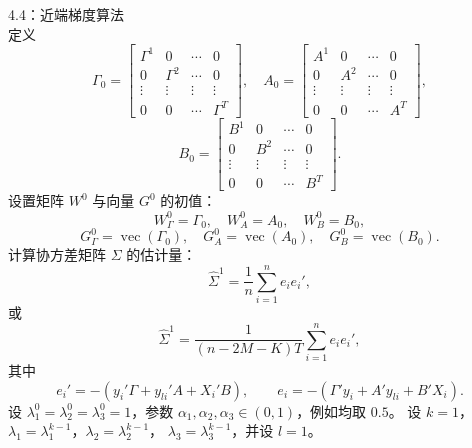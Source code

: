 \begin{bookalgorithm}{4.4：近端梯度算法}
\[\]
定义
\[
\Gamma_0=\begin{bmatrix}\Gamma^1&0&\cdots&0\\0&\Gamma^2&\cdots&0\\\vdots&\vdots&\vdots&\vdots\\0&0&\cdots&\Gamma^T\end{bmatrix},\quad
A_0=\begin{bmatrix}A^1&0&\cdots&0\\0&A^2&\cdots&0\\\vdots&\vdots&\vdots&\vdots\\0&0&\cdots&A^T\end{bmatrix},
\]
\[
B_0=\begin{bmatrix}B^1&0&\cdots&0\\0&B^2&\cdots&0\\\vdots&\vdots&\vdots&\vdots\\0&0&\cdots&B^T\end{bmatrix}.
\]
设置矩阵 $W^0$ 与向量 $G^0$ 的初值：
\[
W_\Gamma^0=\Gamma_0,\quad W_A^0=A_0,\quad W_B^0=B_0,
\]
\[
G_\Gamma^0=\operatorname{vec}(\Gamma_0),\quad
G_A^0=\operatorname{vec}(A_0),\quad G_B^0=\operatorname{vec}(B_0).
\]
计算协方差矩阵 $\Sigma$ 的估计量：
\begin{equation}
\widehat\Sigma^1=\frac1n\sum_{i=1}^{n}e_ie_i',\tag{4.216}
\end{equation}
或
\begin{equation}
\widehat\Sigma^1=\frac{1}{(n-2M-K)T}\sum_{i=1}^{n}e_ie_i',\tag{4.217}
\end{equation}
其中
\[
e_i'=-(y_i'\Gamma+y_{li}'A+X_i'B),\qquad
e_i=-(\Gamma'y_i+A'y_{li}+B'X_i).
\]
设 $\lambda_1^0=\lambda_2^0=\lambda_3^0=1$，参数
$\alpha_1,\alpha_2,\alpha_3\in(0,1)$，例如均取 $0.5$。
设 $k=1$，$\lambda_1=\lambda_1^{k-1}$，$\lambda_2=\lambda_2^{k-1}$，
$\lambda_3=\lambda_3^{k-1}$，并设 $l=1$。


\end{bookalgorithm}

